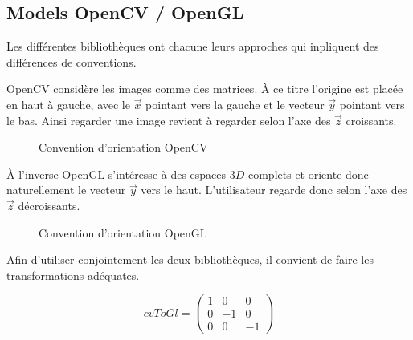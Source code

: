 \documentclass[10pt,a4paper,twoside, twocolumn]{report}
\newcommand*{\rootPath}{../}
\begin{document}
\subsection{Models OpenCV / OpenGL}

Les différentes bibliothèques ont chacune leurs approches qui inpliquent des différences de conventions.

OpenCV considère les images comme des matrices. À ce titre l’origine est placée en haut à gauche, avec le $\vec x$ pointant vers la gauche et le vecteur $\vec y$ pointant vers le bas. Ainsi regarder une image revient à regarder selon l’axe des $\vec z$ croissants.

\begin{figure}[!ht]
	\centering
	
	\caption{Convention d’orientation OpenCV}
	\label{fig:tikz:space-opencv}
\end{figure}

À l’inverse OpenGL s’intéresse à des espaces $3D$ complets et oriente donc naturellement le vecteur $\vec y$ vers le haut. L’utilisateur regarde donc selon l’axe des $\vec z$ décroissants.

\begin{figure}[!ht]
	\centering
	
	\caption{Convention d’orientation OpenGL}
	\label{fig:tikz:space-opengl}
\end{figure}

Afin d’utiliser conjointement les deux bibliothèques, il convient de faire les transformations adéquates.

\begin{equation}
	cvToGl = \begin{pmatrix}1 & 0 & 0 \\ 0 & -1 & 0 \\ 0 & 0 & -1\end{pmatrix}
\end{equation}

\ifstandalone
	
	
\fi
\end{document}
